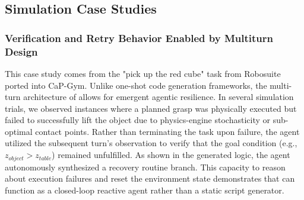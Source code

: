 \subsection{Simulation Case Studies}
\subsubsection{Verification and Retry Behavior Enabled by Multiturn Design}
\label{app:retry_behavior}
This case study comes from the "pick up the red cube" task from Robosuite ported into CaP-Gym. Unlike one-shot code generation frameworks, the multi-turn architecture of \sysname{} allows for emergent agentic resilience. In several simulation trials, we observed instances where a planned grasp was physically executed but failed to successfully lift the object due to physics-engine stochasticity or sub-optimal contact points. Rather than terminating the task upon failure, the agent utilized the subsequent turn's observation to verify that the goal condition (e.g., $z_{object} > z_{table}$) remained unfulfilled. As shown in the generated logic, the agent autonomously synthesized a recovery routine branch. This capacity to reason about execution failures and reset the environment state demonstrates that \sysname{} can function as a closed-loop reactive agent rather than a static script generator.

